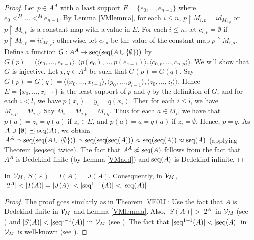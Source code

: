 \begin{proof}
Let $p\in A^{A}$ with a least support $E=\{e_{0},\dotsc,e_{n-1}\}$ where $e_{0}<^{M}\dotsc<^{M}e_{n-1}$. By Lemma \ref{VMlemma}, for each $i\leq n$, $p\restriction M_{i,p} = id_{M_{i,p}}$ or $p\restriction M_{i,p}$ is a constant map with a value in $E$. For each $i\leq n$, let $c_{i,p}=\emptyset$ if $p\restriction M_{i,p} = id_{M_{i,p}}$; otherwise, let $c_{i,p}$ be the value of the constant map $p\restriction M_{i,p}$. Define a function $G:A^{A}\to \textup{seq}(\textup{seq}(A\cup\{\emptyset\}))$ by $G(p)=\langle \langle e_{0},\dotsc,e_{n-1}\rangle, \langle p(e_{0}),\dotsc,p(e_{n-1})\rangle, \langle c_{0,p},\dotsc,c_{n,p}\rangle \rangle$. We will show that $G$ is injective. Let $p,q\in A^{A}$ be such that $G(p)=G(q)$.
Say $G(p)=G(q)=\langle\langle x_{0},\dotsc,x_{l-1}\rangle,\langle y_{0},\dotsc,y_{l-1}\rangle,\langle z_{0},\dotsc,z_{l}\rangle\rangle$. Hence $E=\{x_{0},\dotsc,x_{l-1}\}$ is the least support of $p$ and $q$ by the definition of $G$, and for each $i<l$, we have $p(x_{i})=y_{i}=q(x_{i})$. Then for each $i\leq l$, we have $M_{i,p}=M_{i,q}$. Say $M_{i}=M_{i,p}=M_{i,q}$. Thus for each $a\in M_{i}$, we have that $p(a)=z_{i}=q(a)$ if $z_{i}\in E$, and $p(a)=a=q(a)$ if $z_{i}=\emptyset$. Hence, $p=q$.
As $A\cup\{\emptyset\} \preceq \textup{seq}(A)$, we obtain $A^A \preceq \textup{seq}(\textup{seq}(A\cup\{\emptyset\}))\preceq \textup{seq}(\textup{seq}(\textup{seq}(A))) \approx \textup{seq}(\textup{seq}(A)) \approx \textup{seq}(A)$ (applying Theorem \ref{seqseq} twice). The fact that $A^{A}\not\approx \textup{seq}(A)$ follows from the fact that $A^{A}$ is Dedekind-finite (by Lemma \ref{VMadd}) and $\textup{seq}(A)$ is Dedekind-infinite. 
\end{proof}

\begin{theorem}\label{VMlast}
In $\mathcal{V}_{M}$, $S(A) = I(A) = J(A)$. Consequently, in $\mathcal{V}_{M}$, $|2^{A}|<|I(A)|=|J(A)|<|\seq^{1-1}(A)|<|\seq(A)|$.
\end{theorem}

\begin{proof}
The proof goes similarly as in Theorem \ref{VF0IJ}: Use the fact that $A$ is Dedekind-finite in $\mathcal{V}_{M}$ and Lemma \ref{VMlemma}. Also, $|S(A)|>|2^{A}|$ in $\mathcal{V}_{M}$ (see \cite[Theorems 2.4 and 2.14]{DH}) and $|S(A)|<|\seq^{1-1}(A)|$ in $\mathcal{V}_{M}$ (see \cite[Theorem 3.2]{SonVej2019}). The fact that $|\seq^{1-1}(A)|<|\seq(A)|$ in $\mathcal{V}_{M}$ is well-known (see \cite[Proposition 7.2.3]{HalSheRela}).
\end{proof}





